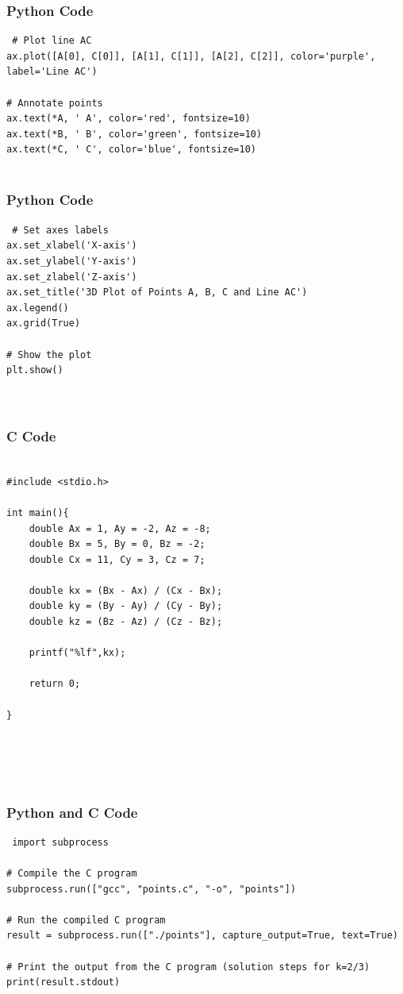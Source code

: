 \documentclass{beamer}
\begin{document}
\begin{frame}[fragile]
    \frametitle{Python Code}

    \begin{lstlisting}
 # Plot line AC
ax.plot([A[0], C[0]], [A[1], C[1]], [A[2], C[2]], color='purple', label='Line AC')

# Annotate points
ax.text(*A, ' A', color='red', fontsize=10)
ax.text(*B, ' B', color='green', fontsize=10)
ax.text(*C, ' C', color='blue', fontsize=10)


    \end{lstlisting}
\end{frame}

\begin{frame}[fragile]
    \frametitle{Python Code}

    \begin{lstlisting}
 # Set axes labels
ax.set_xlabel('X-axis')
ax.set_ylabel('Y-axis')
ax.set_zlabel('Z-axis')
ax.set_title('3D Plot of Points A, B, C and Line AC')
ax.legend()
ax.grid(True)

# Show the plot
plt.show()



\end{lstlisting}
\end{frame}

 



 


\begin{frame}[fragile]
\frametitle{C Code}
\begin{lstlisting}
  
#include <stdio.h>

int main(){
    double Ax = 1, Ay = -2, Az = -8;
    double Bx = 5, By = 0, Bz = -2;
    double Cx = 11, Cy = 3, Cz = 7;

    double kx = (Bx - Ax) / (Cx - Bx);
    double ky = (By - Ay) / (Cy - By);
    double kz = (Bz - Az) / (Cz - Bz);

    printf("%lf",kx);

    return 0;

}





\end{lstlisting}

\end{frame}


\begin{frame}[fragile]
\frametitle{Python and C Code}

\begin{lstlisting}
 import subprocess

# Compile the C program
subprocess.run(["gcc", "points.c", "-o", "points"])

# Run the compiled C program
result = subprocess.run(["./points"], capture_output=True, text=True)

# Print the output from the C program (solution steps for k=2/3)
print(result.stdout) 

\end{lstlisting}

\end{frame}
\end{document}
